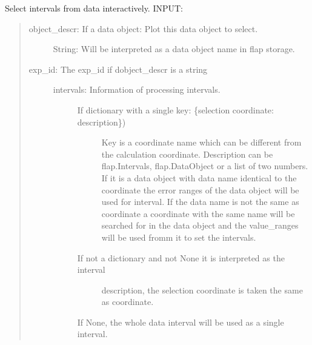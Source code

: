 \documentclass[letterpaper,10pt,english]{sphinxmanual}
\begin{document}
\begin{fulllineitems}
\label{\detokenize{select:flap.select.select_intervals}}
Select intervals from data interactively.
INPUT:
\begin{quote}
\begin{description}
\item[{object\_descr: If a data object: Plot this data object to select.}] \leavevmode
String: Will be interpreted as a data object name in flap storage.

\item[{exp\_id: The exp\_id if dobject\_descr is a string}] \leavevmode\begin{description}
\item[{intervals: Information of processing intervals.}] \leavevmode\begin{description}
\item[{If dictionary with a single key: \{selection coordinate: description\})}] \leavevmode
Key is a coordinate name which can be different from the calculation
coordinate.
Description can be flap.Intervals, flap.DataObject or
a list of two numbers. If it is a data object with data name identical to
the coordinate the error ranges of the data object will be used for
interval. If the data name is not the same as coordinate a coordinate with the
same name will be searched for in the data object and the value\_ranges
will be used fromm it to set the intervals.

\item[{If not a dictionary and not None it is interpreted as the interval}] \leavevmode
description, the selection coordinate is taken the same as
coordinate.

\end{description}

If None, the whole data interval will be used as a single interval.

\end{description}


\end{description}
\end{quote}
\end{fulllineitems}
\end{document}
